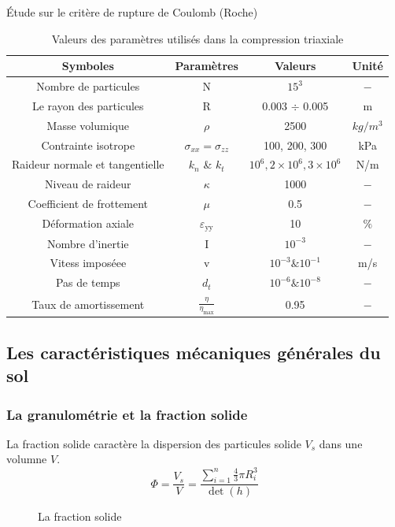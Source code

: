 \documentclass[a4paper,12pt]{report}
\begin{document}
\begin{frame}{Étude sur le critère de rupture de Coulomb (Roche)}
\begin{table}
\centering
\begin{tabular}{|c|c|c|c|}
\hline
\textbf{Symboles} & \textbf{Paramètres} & \textbf{Valeurs} & \textbf{Unité} \\ 
\hline
Nombre de particules & N & $15^3$ & $-$ \\  
\hline
Le rayon des particules & R & 0.003 $\div$ 0.005 & m \\  
\hline
Masse volumique & $\rho$  & 2500 & $kg/m^3$ \\
\hline
Contrainte isotrope & $\sigma_{xx} = \sigma_{zz}$ & 100, 200, 300 & kPa \\ 
\hline
Raideur normale et tangentielle & $k_n$ \& $k_t$ & $10^6, 2 \times 10^6, 3 \times 10^6$ & N/m \\ 
\hline
Niveau de raideur & $\kappa$ & 1000 & $-$ \\ 
\hline
Coefficient de frottement & $\mu$ & 0.5 & $-$ \\ 
\hline
Déformation axiale & $\varepsilon_{\text{yy}}$ &  10 & $\%$ \\ 
\hline
Nombre d’inertie & I & $10^{-3}$ & $-$ \\ 
\hline
Vitess imposéee & v & $10^{-3} \& 10^{-1}$ & m/s \\ 
\hline
Pas de temps & $d_t$  & $10^{-6} \& 10^{-8}$ & $-$\\
\hline
Taux de amortissement & $\frac{\eta}{\eta_{\max}}$  & 0.95 & $-$\\
\hline
\end{tabular}
\caption{Valeurs des paramètres utilisés dans la compression triaxiale}
\end{table}
\end{frame}
\subsection{Les caractéristiques mécaniques générales du sol}
\subsubsection{La granulométrie et la fraction solide}
La fraction solide caractère la dispersion des particules solide $V_s$ dans une volumne $V$.
\begin{equation}
\Phi = \dfrac{V_s}{V} = \dfrac{\sum\limits_{i = 1}^n \frac{4}{3}\pi R_i^3}{\det(h)}
\end{equation}
                                \begin{figure}
                                   \centering \small 
                                    \caption{La fraction solide}
                                    \label{fig:fractionSolideMax}
                                \end{figure}
\end{document}
